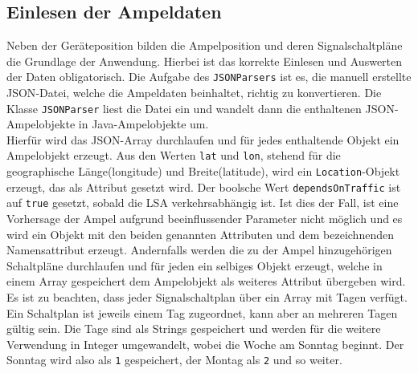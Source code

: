 \subsection{Einlesen der Ampeldaten}
Neben der Geräteposition bilden die Ampelposition und deren Signalschaltpläne die Grundlage der Anwendung. Hierbei ist das korrekte Einlesen und Auswerten der Daten obligatorisch. Die Aufgabe des \texttt{JSONParsers} ist es, die manuell erstellte \gls{JSON}-Datei, welche die Ampeldaten beinhaltet, richtig zu konvertieren. Die Klasse \texttt{JSONParser} liest die Datei ein und wandelt dann die enthaltenen \gls{JSON}-Ampelobjekte in Java-Ampelobjekte um.\\ 
Hierfür wird das \gls{JSON}-Array durchlaufen und für jedes enthaltende Objekt ein Ampelobjekt erzeugt. Aus den Werten \texttt{lat} und \texttt{lon}, stehend für die geographische Länge(longitude) und Breite(latitude), wird ein \texttt{Location}-Objekt erzeugt, das als Attribut gesetzt wird. Der boolsche Wert \texttt{dependsOnTraffic} ist auf \texttt{true} gesetzt, sobald die \gls{LSA} verkehrsabhängig ist. Ist dies der Fall, ist eine Vorhersage der Ampel aufgrund beeinflussender Parameter nicht möglich und es wird ein Objekt mit den beiden genannten Attributen und dem bezeichnenden Namensattribut erzeugt. Andernfalls werden die zu der Ampel hinzugehörigen Schaltpläne durchlaufen und für jeden ein selbiges Objekt erzeugt, welche in einem Array gespeichert dem Ampelobjekt als weiteres Attribut übergeben wird. Es ist zu beachten, dass jeder Signalschaltplan über ein Array mit Tagen verfügt. Ein Schaltplan ist jeweils einem Tag zugeordnet, kann aber an mehreren Tagen gültig sein. Die Tage sind als Strings gespeichert und werden für die weitere Verwendung in Integer umgewandelt, wobei die Woche am Sonntag beginnt. Der Sonntag wird also als \texttt{1} gespeichert, der Montag als \texttt{2} und so weiter. 
%
%
